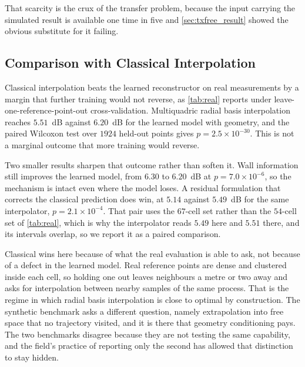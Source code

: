 That scarcity is the crux of the transfer problem, because the input carrying the
simulated result is available one time in five and \cref{sec:txfree_result} showed
the obvious substitute for it failing.

\begin{table}[t]
\centering\footnotesize

\caption{\textbf{Reconstruction on real indoor cellular measurements}, held-out
reference points with a $1$~m exclusion buffer, $1924$ points over $54$ cells. The
right column is a paired Wilcoxon test against the learned model with geometry.
Classical interpolation wins here, and \cref{sec:real} explains why the two
benchmarks disagree.}
\label{tab:real}
\end{table}

\subsection{Comparison with Classical Interpolation}

Classical interpolation beats the learned reconstructor on real measurements by a
margin that further training would not reverse, as \cref{tab:real} reports under
leave-one-reference-point-out cross-validation. Multiquadric radial basis interpolation reaches
$5.51$~dB against $6.20$~dB for the learned model with geometry, and the paired
Wilcoxon test over $1924$ held-out points gives $p = 2.5 \times 10^{-30}$. This is
not a marginal outcome that more training would reverse.

Two smaller results sharpen that outcome rather than soften it. Wall information
still improves the learned model, from $6.30$ to $6.20$~dB at
$p = 7.0 \times 10^{-6}$, so the mechanism is intact even where the model loses. A
residual formulation that corrects the classical prediction does win, at $5.14$
against $5.49$~dB for the same interpolator, $p = 2.1 \times 10^{-4}$. That pair uses
the $67$-cell set rather than the $54$-cell set of \cref{tab:real}, which is why the
interpolator reads $5.49$ here and $5.51$ there, and its intervals overlap, so we
report it as a paired comparison.

Classical wins here because of what the real evaluation is able to ask, not because
of a defect in the learned model. Real reference points are dense and clustered inside each cell, so
holding one out leaves neighbours a metre or two away and asks for interpolation
between nearby samples of the same process. That is the regime in which radial
basis interpolation is close to optimal by construction. The synthetic benchmark
asks a different question, namely extrapolation into free space that no trajectory
visited, and it is there that geometry conditioning pays. The two benchmarks
disagree because they are not testing the same capability, and the field's practice
of reporting only the second has allowed that distinction to stay hidden.

